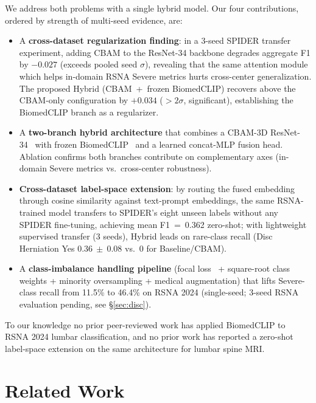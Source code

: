 \documentclass[conference]{IEEEtran}
\begin{document}
We address both problems with a single hybrid model. Our four
contributions, ordered by strength of multi-seed evidence, are:
\begin{itemize}
\item A \textbf{cross-dataset regularization finding}: in a 3-seed
      SPIDER transfer experiment, adding CBAM to the ResNet-34
      backbone degrades aggregate F1 by $-0.027$ (exceeds pooled
      seed $\sigma$), revealing that the same attention module which
      helps in-domain RSNA Severe metrics hurts cross-center
      generalization. The proposed Hybrid (CBAM~+~frozen BiomedCLIP)
      recovers above the CBAM-only configuration by $+0.034$
      ($> 2\sigma$, significant), establishing the BiomedCLIP branch
      as a regularizer.
\item A \textbf{two-branch hybrid architecture} that combines a CBAM-3D
      ResNet-34~\cite{woo2018cbam,he2016resnet} with frozen
      BiomedCLIP~\cite{zhang2023biomedclip} and a learned concat-MLP
      fusion head. Ablation confirms both branches contribute on
      complementary axes (in-domain Severe metrics vs.\ cross-center
      robustness).
\item \textbf{Cross-dataset label-space extension}: by routing the fused
      embedding through cosine similarity against text-prompt
      embeddings, the same RSNA-trained model transfers to SPIDER's
      eight unseen labels without any SPIDER fine-tuning, achieving
      mean F1~=~0.362 zero-shot; with lightweight supervised transfer
      (3 seeds), Hybrid leads on rare-class recall (Disc Herniation
      Yes $0.36~\pm~0.08$ vs.\ $0$ for Baseline/CBAM).
\item A \textbf{class-imbalance handling pipeline} (focal
      loss~\cite{lin2017focal} + square-root class weights + minority
      oversampling + medical augmentation) that lifts Severe-class
      recall from 11.5\% to 46.4\% on RSNA 2024 (single-seed; 3-seed
      RSNA evaluation pending, see \S\ref{sec:disc}).
\end{itemize}

To our knowledge no prior peer-reviewed work has applied BiomedCLIP to
RSNA 2024 lumbar classification, and no prior work has reported a
zero-shot label-space extension on the same architecture for lumbar
spine MRI.

\section{Related Work}
\label{sec:related}
\end{document}
